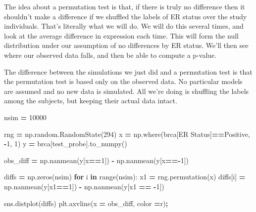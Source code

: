 \documentclass[
  letterpaper,
]{scrbook}
\newenvironment{Shaded}{\begin{snugshade}}{\end{snugshade}}
\newcommand{\BuiltInTok}[1]{#1}
\newcommand{\ControlFlowTok}[1]{\textcolor[rgb]{0.13,0.29,0.53}{\textbf{#1}}}
\newcommand{\DecValTok}[1]{\textcolor[rgb]{0.00,0.00,0.81}{#1}}
\newcommand{\KeywordTok}[1]{\textcolor[rgb]{0.13,0.29,0.53}{\textbf{#1}}}
\newcommand{\NormalTok}[1]{#1}
\newcommand{\OperatorTok}[1]{\textcolor[rgb]{0.81,0.36,0.00}{\textbf{#1}}}
\newcommand{\StringTok}[1]{\textcolor[rgb]{0.31,0.60,0.02}{#1}}
\begin{document}
The idea about a permutation test is that, if there is truly no difference then it shouldn't make a difference if we shuffled the labels of ER status over the study individuals. That's literally what we will do. We will do this several times, and look at the average difference in expression each time. This will form the null distribution under our assumption of no differences by ER status. We'll then see where our observed data falls, and then be able to compute a p-value.

The difference between the simulations we just did and a permutation test is that the permutation test is based only on the observed data. No particular models are assumed and no new data is simulated. All we're doing is shuffling the labels among the subjects, but keeping their actual data intact.

\begin{Shaded}
\begin{Highlighting}[]
\NormalTok{nsim }\OperatorTok{=} \DecValTok{10000}

\NormalTok{rng }\OperatorTok{=}\NormalTok{ np.random.RandomState(}\DecValTok{294}\NormalTok{)}
\NormalTok{x }\OperatorTok{=}\NormalTok{ np.where(brca[}\StringTok{\textquotesingle{}ER Status\textquotesingle{}}\NormalTok{]}\OperatorTok{==}\StringTok{\textquotesingle{}Positive\textquotesingle{}}\NormalTok{, }\OperatorTok{{-}}\DecValTok{1}\NormalTok{, }\DecValTok{1}\NormalTok{)}
\NormalTok{y }\OperatorTok{=}\NormalTok{ brca[test\_probe].to\_numpy()}

\NormalTok{obs\_diff }\OperatorTok{=}\NormalTok{ np.nanmean(y[x}\OperatorTok{==}\DecValTok{1}\NormalTok{]) }\OperatorTok{{-}}\NormalTok{ np.nanmean(y[x}\OperatorTok{=={-}}\DecValTok{1}\NormalTok{])}

\NormalTok{diffs }\OperatorTok{=}\NormalTok{ np.zeros(nsim)}
\ControlFlowTok{for}\NormalTok{ i }\KeywordTok{in} \BuiltInTok{range}\NormalTok{(nsim):}
\NormalTok{    x1 }\OperatorTok{=}\NormalTok{ rng.permutation(x)}
\NormalTok{    diffs[i] }\OperatorTok{=}\NormalTok{ np.nanmean(y[x1}\OperatorTok{==}\DecValTok{1}\NormalTok{]) }\OperatorTok{{-}}\NormalTok{ np.nanmean(y[x1 }\OperatorTok{==} \OperatorTok{{-}}\DecValTok{1}\NormalTok{])}
\end{Highlighting}
\end{Shaded}

\begin{Shaded}
\begin{Highlighting}[]
\NormalTok{sns.distplot(diffs)}
\NormalTok{plt.axvline(x }\OperatorTok{=}\NormalTok{ obs\_diff, color }\OperatorTok{=}\StringTok{\textquotesingle{}r\textquotesingle{}}\NormalTok{)}\OperatorTok{;}
\end{Highlighting}
\end{Shaded}
\end{document}
